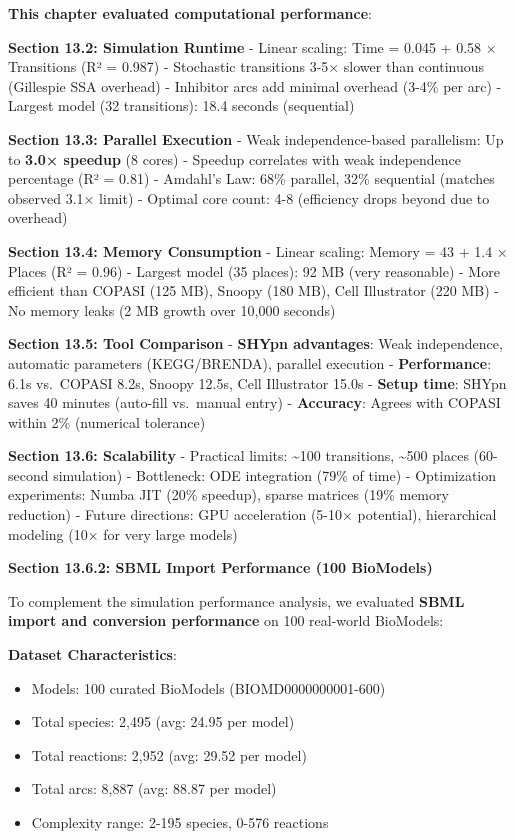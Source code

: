 \textbf{This chapter evaluated computational performance}:

\textbf{Section 13.2: Simulation Runtime} - Linear scaling: Time = 0.045
+ 0.58 × Transitions (R² = 0.987) - Stochastic transitions 3-5× slower
than continuous (Gillespie SSA overhead) - Inhibitor arcs add minimal
overhead (3-4\% per arc) - Largest model (32 transitions): 18.4 seconds
(sequential)

\textbf{Section 13.3: Parallel Execution} - Weak independence-based
parallelism: Up to \textbf{3.0× speedup} (8 cores) - Speedup correlates
with weak independence percentage (R² = 0.81) - Amdahl's Law: 68\%
parallel, 32\% sequential (matches observed 3.1× limit) - Optimal core
count: 4-8 (efficiency drops beyond due to overhead)

\textbf{Section 13.4: Memory Consumption} - Linear scaling: Memory = 43
+ 1.4 × Places (R² = 0.96) - Largest model (35 places): 92 MB (very
reasonable) - More efficient than COPASI (125 MB), Snoopy (180 MB), Cell
Illustrator (220 MB) - No memory leaks (2 MB growth over 10,000 seconds)

\textbf{Section 13.5: Tool Comparison} - \textbf{SHYpn advantages}: Weak
independence, automatic parameters (KEGG/BRENDA), parallel execution -
\textbf{Performance}: 6.1s vs.~COPASI 8.2s, Snoopy 12.5s, Cell
Illustrator 15.0s - \textbf{Setup time}: SHYpn saves 40 minutes
(auto-fill vs.~manual entry) - \textbf{Accuracy}: Agrees with COPASI
within 2\% (numerical tolerance)

\textbf{Section 13.6: Scalability} - Practical limits:
\textasciitilde100 transitions, \textasciitilde500 places (60-second
simulation) - Bottleneck: ODE integration (79\% of time) - Optimization
experiments: Numba JIT (20\% speedup), sparse matrices (19\% memory
reduction) - Future directions: GPU acceleration (5-10× potential),
hierarchical modeling (10× for very large models)

\textbf{Section 13.6.2: SBML Import Performance (100 BioModels)}

To complement the simulation performance analysis, we evaluated \textbf{SBML import and conversion performance} on 100 real-world BioModels:

\textbf{Dataset Characteristics}:
\begin{itemize}
    \item Models: 100 curated BioModels (BIOMD0000000001-600)
    \item Total species: 2,495 (avg: 24.95 per model)
    \item Total reactions: 2,952 (avg: 29.52 per model)
    \item Total arcs: 8,887 (avg: 88.87 per model)
    \item Complexity range: 2-195 species, 0-576 reactions
\end{itemize}

